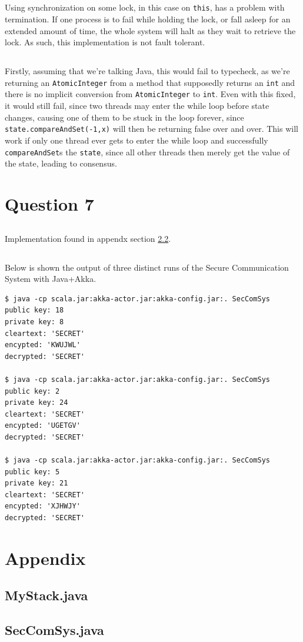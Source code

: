 \documentclass[a5paper]{article}
\begin{document}
\subsection{}
Using synchronization on some lock, in this case on \texttt{this}, has a problem with termination. If one process is to fail while holding the lock, or fall asleep for an extended amount of time,
the whole system will halt as they wait to retrieve the lock. As such, this implementation is not fault tolerant.

\subsection{}
Firstly, assuming that we're talking Java, this would fail to typecheck, as we're returning an \texttt{AtomicInteger} from a method that supposedly returns an \texttt{int} and there is no implicit conversion from \texttt{AtomicInteger} to \texttt{int}. Even with this fixed, it would still fail, since two threads may enter the while loop before state changes, causing one of them to be stuck in the loop forever, since \texttt{state.compareAndSet(-1,x)} will then be returning false over and over. This will work if only one thread ever gets to enter the while loop and successfully \texttt{compareAndSet}s the \texttt{state}, since all other threads then merely get the value of the state, leading to consensus.

\section{Question 7}
\subsection{}
Implementation found in appendx section \ref{sec:akka}.

\subsection{}
Below is shown the output of three distinct runs of the Secure Communication System with Java+Akka.
\begin{verbatim}
$ java -cp scala.jar:akka-actor.jar:akka-config.jar:. SecComSys
public key: 18
private key: 8
cleartext: 'SECRET'
encypted: 'KWUJWL'
decrypted: 'SECRET'

$ java -cp scala.jar:akka-actor.jar:akka-config.jar:. SecComSys
public key: 2
private key: 24
cleartext: 'SECRET'
encypted: 'UGETGV'
decrypted: 'SECRET'

$ java -cp scala.jar:akka-actor.jar:akka-config.jar:. SecComSys
public key: 5
private key: 21
cleartext: 'SECRET'
encypted: 'XJHWJY'
decrypted: 'SECRET'
\end{verbatim}

\section{Appendix}
\subsection{MyStack.java}

\subsection{SecComSys.java}\label{sec:akka}

\end{document}
